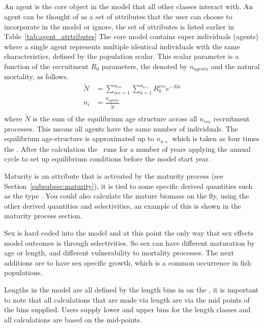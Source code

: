 \subsection{\label{sec:individuals}}
An agent is the core object in the model that all other classes interact with. An agent can be thought of as a set of attributes that the user can choose to incorporate in the model or ignore, the set of attributes is listed earlier in Table~\ref{tab:agent_atrtributes}
%
The core model contains super individuals (agents) where a single agent represents multiple identical individuals with the same characteristics, defined by the population scalar. This scalar parameter is a function of the recruitment \(R_0\) parameters, the  denoted by \(n_{agents}\) and the natural mortality, as follows.
\begin{align}
\widetilde{N} &= \sum\limits_{rec = 1}^{n_{rec}} \sum\limits_{a = 1}^{n_{a+}} R_0^{rec} e^{-M  a}\\
n_i &=  \frac{n_{agents}}{\widetilde{N} }\\
\end{align}
%
where \(\widetilde{N}\) is the sum of the equilibrium age structure across all \(n_{rec}\) recruitment processes. This means all agents have the same number of individuals. The equilibrium age-structure is approximated up to \(n_{a+}\) which is taken as four times the . After the calculation the \IBM\ runs for a number of years applying the annual cycle to set up equilibrium conditions before the model start year. 

Maturity is an attribute that is activated by the maturity process (see Section~\ref{subsubsec:maturity}), it is tied to some specific derived quantities such as the type . You could also calculate the mature biomass on the fly, using the other derived quantities and selectivities, an example of this is shown in the maturity process section.

Sex is hard coded into the model and at this point the only way that sex effects model outcomes is through selectivities. So sex can have different maturation by age or length, and different vulnerability to mortality processes. The next additions are to have sex specific growth, which is a common occurrence in fish populations.

Lengths in the model are all defined by the length bins in on the , it is important to note that all calculations that are made via length are via the mid points of the bins supplied. Users supply lower and upper bins for the length classes and all calculations are based on the mid-points.

